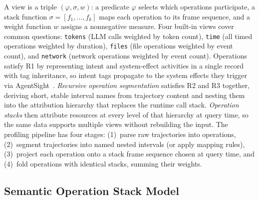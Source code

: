 \documentclass[sigconf,nonacm]{acmart}
\begin{document}
A view is a triple $(\varphi, \sigma, w)$: a predicate
$\varphi$ selects which operations participate, a stack function
$\sigma = [f_1, \ldots, f_k]$ maps each operation to its frame
sequence, and a weight function $w$ assigns a nonnegative measure.
Four built-in views cover common questions: \texttt{tokens} (LLM calls weighted by token count), \texttt{time} (all timed operations weighted by duration), \texttt{files} (file operations weighted by event count), and \texttt{network} (network operations weighted by event count).
Operations satisfy R1 by representing intent and system-effect activities in a single record with tag inheritance, so intent tags propagate to the system effects they trigger via AgentSight~\cite{agentsight}.
\emph{Recursive operation segmentation} satisfies R2 and R3 together, deriving short, stable interval names from trajectory content and nesting them into the attribution hierarchy that replaces the runtime call stack.
\emph{Operation stacks} then attribute resources at every level of that hierarchy at query time, so the same data supports multiple views without rebuilding the input.
The profiling pipeline has four stages: (1)~parse raw trajectories into operations, (2)~segment trajectories into named nested intervals (or apply mapping rules), (3)~project each operation onto a stack frame sequence chosen at query time, and (4)~fold operations with identical stacks, summing their weights.

\subsection{Semantic Operation Stack Model}
\label{sec:ops}
\end{document}
